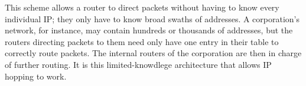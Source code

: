 \par This scheme allows a router to direct packets without having to know every individual IP; they only have to know broad swaths of addresses. A corporation's network, for instance, may contain hundreds or thousands of addresses, but the routers directing packets to them need only have one entry in their table to correctly route packets. The internal routers of the corporation are then in charge of further routing. It is this limited-knowdlege architecture that allows IP hopping to work.

\begin{comment}

\subsection{\ac{IPv4} Packet Structure}
\label{sec:ipv4}
\par 

\begin{table}
\caption{IPv4 header structure}
\label{tab:ipv4}
\begin{tabular}{|c|c|c|c|c|c|c|c||c|c|c|c|c|c|c|c||c|c|c|c|c|c|c|c||c|c|c|c|c|c|c|c|}
\hline
	\multicolumn{32}{|c|}{\textbf{IPv4 Structure (32 bits wide)}}\\
\hline
	0 & 1 & 2 & 3 & 4 & 5 & 6 & 7 & 8 & 9 & 10 & 11 & 12 & 13 & 14 & 15 & 16 & 17 & 18 & 19 & 20 & 21 & 22 & 23 & 24 & 25 & 26 & 27 & 28 & 29 & 30 & 31\\
\hline
\hline
	\multicolumn{4}{|c|}{Version} & \multicolumn{4}{|c|}{Header Len} & \multicolumn{8}{|c|}{TOS} & \multicolumn{16}{|c|}{Len}\\
	\hline
	\multicolumn{16}{|c|}{ID} & \multicolumn{3}{|c|}{Frag Flags} & \multicolumn{13}{|c|}{Fragment Offset}\\
	\hline
	\multicolumn{8}{|c|}{TTL} & \multicolumn{8}{|c|}{Protocol} & \multicolumn{16}{|c|}{Header Checksum}\\
	\hline
	\multicolumn{32}{|c|}{Source IP}\\
	\hline
	\multicolumn{32}{|c|}{Destination IP}\\
	\hline
	\multicolumn{32}{|c|}{Options (optional, specified by header len)}\\
\hline
\end{tabular}
\end{table}
\end{comment}


